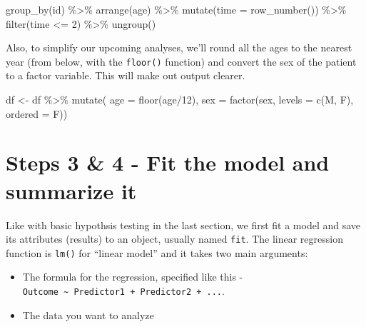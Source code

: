 \documentclass[
]{book}
\newenvironment{Shaded}{\begin{snugshade}}{\end{snugshade}}
\newcommand{\AttributeTok}[1]{\textcolor[rgb]{0.77,0.63,0.00}{#1}}
\newcommand{\DecValTok}[1]{\textcolor[rgb]{0.00,0.00,0.81}{#1}}
\newcommand{\FunctionTok}[1]{\textcolor[rgb]{0.00,0.00,0.00}{#1}}
\newcommand{\NormalTok}[1]{#1}
\newcommand{\OtherTok}[1]{\textcolor[rgb]{0.56,0.35,0.01}{#1}}
\newcommand{\SpecialCharTok}[1]{\textcolor[rgb]{0.00,0.00,0.00}{#1}}
\newcommand{\StringTok}[1]{\textcolor[rgb]{0.31,0.60,0.02}{#1}}
\providecommand{\tightlist}{%
  \setlength{\itemsep}{0pt}\setlength{\parskip}{0pt}}
\begin{document}
\begin{Shaded}
\begin{Highlighting}[]
  \FunctionTok{group\_by}\NormalTok{(id) }\SpecialCharTok{\%\textgreater{}\%} 
  \FunctionTok{arrange}\NormalTok{(age) }\SpecialCharTok{\%\textgreater{}\%} 
  \FunctionTok{mutate}\NormalTok{(}\AttributeTok{time =} \FunctionTok{row\_number}\NormalTok{()) }\SpecialCharTok{\%\textgreater{}\%} 
  \FunctionTok{filter}\NormalTok{(time }\SpecialCharTok{\textless{}=} \DecValTok{2}\NormalTok{) }\SpecialCharTok{\%\textgreater{}\%} 
  \FunctionTok{ungroup}\NormalTok{()}
\end{Highlighting}
\end{Shaded}

Also, to simplify our upcoming analyses, we'll round all the ages to the nearest year (from below, with the \texttt{floor()} function) and convert the sex of the patient to a factor variable. This will make out output clearer.

\begin{Shaded}
\begin{Highlighting}[]
\NormalTok{df }\OtherTok{\textless{}{-}}\NormalTok{ df }\SpecialCharTok{\%\textgreater{}\%} 
  \FunctionTok{mutate}\NormalTok{(}
    \AttributeTok{age =} \FunctionTok{floor}\NormalTok{(age}\SpecialCharTok{/}\DecValTok{12}\NormalTok{),}
    \AttributeTok{sex =} \FunctionTok{factor}\NormalTok{(sex, }\AttributeTok{levels =} \FunctionTok{c}\NormalTok{(}\StringTok{\textquotesingle{}M\textquotesingle{}}\NormalTok{, }\StringTok{\textquotesingle{}F\textquotesingle{}}\NormalTok{), }\AttributeTok{ordered =}\NormalTok{ F))}
\end{Highlighting}
\end{Shaded}

\hypertarget{steps-3-4---fit-the-model-and-summarize-it}{%
\section{Steps 3 \& 4 - Fit the model and summarize it}\label{steps-3-4---fit-the-model-and-summarize-it}}

Like with basic hypothsis testing in the last section, we first fit a model and save its attributes (results) to an object, usually named \texttt{fit}. The linear regression function is \texttt{lm()} for ``linear model'' and it takes two main arguments:

\begin{itemize}
\tightlist
\item
  The formula for the regression, specified like this - \texttt{Outcome\ \textasciitilde{}\ Predictor1\ +\ Predictor2\ +\ ...}.
\item
  The data you want to analyze
\end{itemize}
\end{document}
